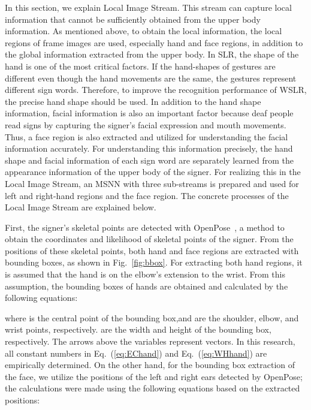 \documentclass[journal]{IEEEtran}
\begin{document}
In this section, we explain Local Image Stream. 
This stream can capture local information that cannot be sufficiently obtained from the upper body information. 
As mentioned above, to obtain the local information, the local regions of frame images are used, 
especially hand and face regions, in addition to the global information extracted from the upper body. 
In SLR, the shape of the hand is one of the most critical factors. 
If the hand-shapes of gestures are different even though the hand movements are the same, 
the gestures represent different sign words. 
Therefore, to improve the recognition performance of WSLR, the precise hand shape should be used. 
In addition to the hand shape information, facial information is also an important factor 
because deaf people read signs by capturing the signer's facial expression and mouth movements. 
Thus, a face region is also extracted and utilized for understanding the facial information accurately. 
For understanding this information precisely, 
the hand shape and facial information of each sign word are separately 
learned from the appearance information of the upper body of the signer. 
For realizing this in the Local Image Stream, 
an MSNN with three sub-streams is prepared and used for left and right-hand regions and the face region. 
The concrete processes of the Local Image Stream are explained below. 

First, the signer's skeletal points are detected with OpenPose~\cite{cao2017openpose}, 
a method to obtain the coordinates and likelihood of skeletal points of the signer. 
From the positions of these skeletal points, 
both hand and face regions are extracted with bounding boxes, as shown in Fig.~\ref{fig:bbox}. 
For extracting both hand regions, it is assumed that the hand is on the elbow's extension to the wrist. 
From this assumption, the bounding boxes of hands are obtained and calculated by the following equations:


where  is the central point of the bounding box,and  are the shoulder, elbow, and wrist points, respectively. 
 are the width and height of the bounding box, respectively. The arrows above the variables represent vectors. 
In this research, all constant numbers in Eq.~(\ref{eq:EChand}) and Eq.~(\ref{eq:WHhand}) are empirically determined. 
On the other hand, for the bounding box extraction of the face, 
we utilize the positions of the left and right ears detected by OpenPose; the calculations were made using the following equations based on the extracted positions: 
\end{document}
